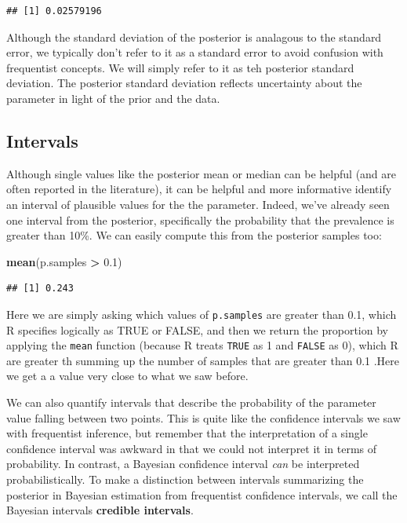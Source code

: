 \documentclass[
]{book}
\newenvironment{Shaded}{\begin{snugshade}}{\end{snugshade}}
\newcommand{\FloatTok}[1]{\textcolor[rgb]{0.00,0.00,0.81}{#1}}
\newcommand{\FunctionTok}[1]{\textcolor[rgb]{0.13,0.29,0.53}{\textbf{#1}}}
\newcommand{\NormalTok}[1]{#1}
\newcommand{\SpecialCharTok}[1]{\textcolor[rgb]{0.81,0.36,0.00}{\textbf{#1}}}
\begin{document}
\begin{verbatim}
## [1] 0.02579196
\end{verbatim}

Although the standard deviation of the posterior is analagous to the standard error, we typically don't refer to it as a standard error to avoid confusion with frequentist concepts. We will simply refer to it as teh posterior standard deviation. The posterior standard deviation reflects uncertainty about the parameter in light of the prior and the data.

\subsection{Intervals}\label{intervals}

Although single values like the posterior mean or median can be helpful (and are often reported in the literature), it can be helpful and more informative identify an interval of plausible values for the the parameter. Indeed, we've already seen one interval from the posterior, specifically the probability that the prevalence is greater than 10\%. We can easily compute this from the posterior samples too:

\begin{Shaded}
\begin{Highlighting}[]
\FunctionTok{mean}\NormalTok{(p.samples }\SpecialCharTok{\textgreater{}} \FloatTok{0.1}\NormalTok{)}
\end{Highlighting}
\end{Shaded}

\begin{verbatim}
## [1] 0.243
\end{verbatim}

Here we are simply asking which values of \texttt{p.samples} are greater than 0.1, which R specifies logically as TRUE or FALSE, and then we return the proportion by applying the \texttt{mean} function (because R treats \texttt{TRUE} as 1 and \texttt{FALSE} as 0), which R are greater th summing up the number of samples that are greater than 0.1 .Here we get a a value very close to what we saw before.

We can also quantify intervals that describe the probability of the parameter value falling between two points. This is quite like the confidence intervals we saw with frequentist inference, but remember that the interpretation of a single confidence interval was awkward in that we could not interpret it in terms of probability. In contrast, a Bayesian confidence interval \emph{can} be interpreted probabilistically. To make a distinction between intervals summarizing the posterior in Bayesian estimation from frequentist confidence intervals, we call the Bayesian intervals \textbf{credible intervals}.
\end{document}
